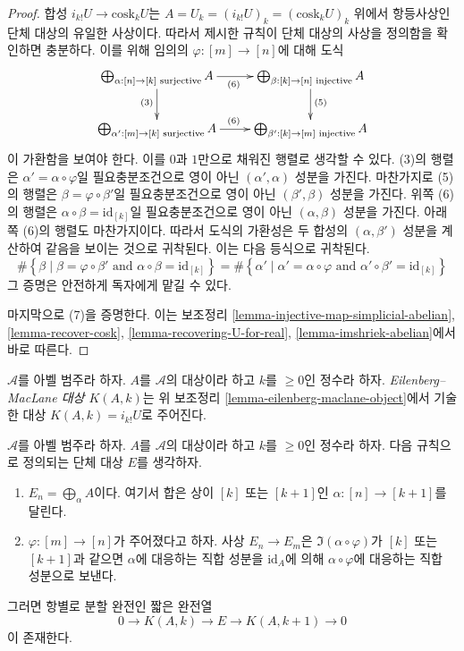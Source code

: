 \begin{proof}
\medskip\noindent
합성 $i_{k!}U \to \text{cosk}_kU$는
$A = U_k = (i_{k!}U)_k = (\text{cosk}_kU)_k$ 위에서 항등사상인
단체 대상의 유일한 사상이다. 따라서 제시한 규칙이 단체 대상의 사상을
정의함을 확인하면 충분하다. 이를 위해 임의의 $\varphi : [m] \to [n]$에
대해 도식
$$
\xymatrix{
\bigoplus_{\alpha : [n] \to [k]\text{ surjective}} A
\ar[d]_{(3)}
\ar[r]_{(6)}
&
\bigoplus_{\beta : [k] \to [n]\text{ injective}} A
\ar[d]^{(5)}
\\
\bigoplus_{\alpha' : [m] \to [k]\text{ surjective}} A
\ar[r]^{(6)}
&
\bigoplus_{\beta' : [k] \to [m]\text{ injective}} A
}
$$
이 가환함을 보여야 한다. 이를 $0$과 $1$만으로 채워진 행렬로 생각할 수
있다. (3)의 행렬은 $\alpha' = \alpha \circ \varphi$일 필요충분조건으로
영이 아닌 $(\alpha', \alpha)$ 성분을 가진다. 마찬가지로 (5)의 행렬은
$\beta = \varphi \circ \beta'$일 필요충분조건으로 영이 아닌
$(\beta', \beta)$ 성분을 가진다. 위쪽 (6)의 행렬은
$\alpha \circ \beta = \text{id}_{[k]}$일 필요충분조건으로 영이 아닌
$(\alpha, \beta)$ 성분을 가진다. 아래쪽 (6)의 행렬도 마찬가지이다.
따라서 도식의 가환성은 두 합성의 $(\alpha, \beta')$ 성분을 계산하여
같음을 보이는 것으로 귀착된다. 이는 다음 등식으로 귀착된다.
$$
\# \left\{
\beta
\mid
\beta = \varphi \circ \beta'
\text{ and }
\alpha \circ \beta = \text{id}_{[k]}
\right\}
=
\# \left\{
\alpha'
\mid
\alpha' = \alpha \circ \varphi
\text{ and }
\alpha' \circ \beta' = \text{id}_{[k]}
\right\}
$$
그 증명은 안전하게 독자에게 맡길 수 있다.

\medskip\noindent
마지막으로 (7)을 증명한다. 이는 보조정리
\ref{lemma-injective-map-simplicial-abelian}, \ref{lemma-recover-cosk},
\ref{lemma-recovering-U-for-real}, \ref{lemma-imshriek-abelian}에서
바로 따른다.
\end{proof}

\begin{definition}
\label{definition-eilenberg-maclane}
$\mathcal{A}$를 아벨 범주라 하자. $A$를 $\mathcal{A}$의 대상이라 하고
$k$를 $\geq 0$인 정수라 하자. {\it Eilenberg--MacLane 대상 $K(A, k)$}는
위 보조정리 \ref{lemma-eilenberg-maclane-object}에서 기술한 대상
$K(A, k) = i_{k!}U$로 주어진다.
\end{definition}


\begin{lemma}
\label{lemma-extension}
$\mathcal{A}$를 아벨 범주라 하자. $A$를 $\mathcal{A}$의 대상이라 하고
$k$를 $\geq 0$인 정수라 하자. 다음 규칙으로 정의되는 단체 대상 $E$를
생각하자.
\begin{enumerate}
\item $E_n = \bigoplus_\alpha A$이다. 여기서 합은 상이 $[k]$ 또는
$[k + 1]$인 $\alpha : [n] \to [k + 1]$를 달린다.
\item $\varphi : [m] \to [n]$가 주어졌다고 하자. 사상
$E_n \to E_m$은 $\Im(\alpha \circ \varphi)$가 $[k]$ 또는 $[k + 1]$과
같으면 $\alpha$에 대응하는 직합 성분을 $\text{id}_A$에 의해
$\alpha \circ \varphi$에 대응하는 직합 성분으로 보낸다.
\end{enumerate}
그러면 항별로 분할 완전인 짧은 완전열
$$
0 \to K(A, k) \to E \to K(A, k + 1) \to 0
$$
이 존재한다.
\end{lemma}

